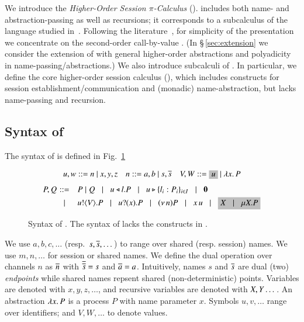 \noindent 
We introduce the 
\emph{Higher-Order Session $\pi$-Calculus} (\HOp).
\HOp includes both name- and abstraction-passing 
as well as recursions; it corresponds to a subcalculus 
of the language
studied 
in~\cite{tlca07}. 
Following the literature~\cite{JeffreyR05},
for simplicity of the presentation
we concentrate on the second-order call-by-value \HOp.  
(In \S\,\ref{sec:extension} we consider the extension of 
\HOp with general higher-order abstractions 
and polyadicity in name-passing/abstractions.)
We also introduce subcalculi of \HOp. In particular, we define the 
core higher-order session
calculus (\HO), which 
includes constructs for session establish\-ment/communication and 
(monadic) name-abstraction, but lacks name-passing and recursion.


\subsection{Syntax of \HOp}
\label{subsec:syntax}
\noindent The syntax of \HOp is defined in Fig.~\ref{fig:syntax}
\begin{figure}[t]
\[ 
\begin{array}{lll}
u,w  ::=  n \ | \ x,y,z
& n ::= a,b  \ | \ s, \dual{s} 
& V,W  ::=   \nonhosyntax{u} \ | \ \abs{x}{P}
\end{array}
\]
\[
\begin{array}{rclllll}
P,Q \!\!\!\!\!\! & ::= & \!\! P\Par Q \bnfbar 
 \bsel{u}{l} P \bnfbar \bbra{u}{l_i:P_i}_{i \in I} \bnfbar \inact \\[1mm]
 & \bnfbar & \!\! \bout{u}{V}{P} \bnfbar \binp{u}{x}{P} \bnfbar \news{n} P 
\bnfbar \appl{x}{u} \bnfbar \nonhosyntax{\rvar{X} \bnfbar \recp{X}{P}}
\end{array}
\]
 \caption{Syntax of \HOp. The syntax of \HO lacks the constructs in .}
\label{fig:syntax}
\Hline
\end{figure}
We use $a,b,c, \dots$ (resp.~$s, \overline{s}, \dots$) 
to range over shared (resp. session) names. 
We use $m, n, \dots$ for session or shared names. 
We define the dual operation over channels $n$ as $\overline{n}$ with
$\overline{\overline{s}} = s$ and $\overline{a} = a$.
Intuitively, names $s$ and $\overline{s}$ are dual (two) \emph{endpoints} while 
shared names repsent shared (non-deterministic) points. 
Variables are denoted with $x, y, z, \dots$, 
and recursive variables are denoted with $X, Y \dots$.
An abstraction $\lambda x.\,P$ is a process $P$ with name parameter $x$.
Symbols $u, v, \dots$ range over identifiers; and  
$V, W, \dots$ to denote values. 

